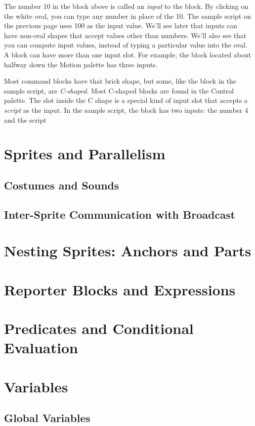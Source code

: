 \documentclass{report}
\begin{document}
The number 10 in the  block above is called an \emph{input} to the block. By clicking on the white oval, you can type any number in place of the 10. The sample script on the previous page uses 100 as the input value. We'll see later that inputs can have non-oval shapes that accept values other than numbers. We'll also see that you can compute input values, instead of typing a particular value into the oval. A block can have more than one input slot. For example, the  block located about halfway down the Motion palette has three inputs.

Most command blocks have that brick shape, but some, like the  block in the sample script, are \emph{C-shaped}. Most C-shaped blocks are found in the Control palette. The slot inside the C shape is a special kind of input slot that accepts a \emph{script} as the input. In the sample script, the  block has two inputs: the number 4 and the script




\section{Sprites and Parallelism}
\subsection{Costumes and Sounds}
\subsection{Inter-Sprite Communication with Broadcast}
\section{Nesting Sprites: Anchors and Parts}
\section{Reporter Blocks and Expressions}
\section{Predicates and Conditional Evaluation}
\section{Variables}
\subsection{Global Variables}
\end{document}
